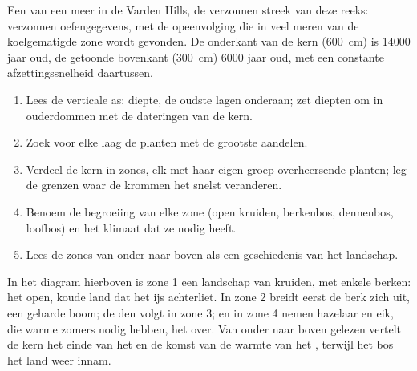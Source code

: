 \begin{omfigure}

{\small Een  van een meer in de Varden Hills, de verzonnen streek
van deze reeks: verzonnen oefengegevens, met de opeenvolging die in veel
meren van de koelgematigde zone wordt gevonden. De onderkant van de kern (\qty{600}{cm}) is
\num{14000} jaar oud, de getoonde bovenkant (\qty{300}{cm}) \num{6000} jaar oud,
met een constante afzettingssnelheid daartussen.}
\end{omfigure}

\begin{method}
\begin{enumerate}
  \item Lees de verticale as: diepte, de oudste lagen onderaan;
        zet diepten om in ouderdommen met de dateringen van de kern.
  \item Zoek voor elke laag de planten met de grootste aandelen.
  \item Verdeel de kern in zones, elk met haar eigen groep overheersende
        planten; leg de grenzen waar de krommen het snelst veranderen.
  \item Benoem de begroeiing van elke zone (open kruiden, berkenbos, dennenbos,
        loofbos) en het klimaat dat ze nodig heeft.
  \item Lees de zones van onder naar boven als een geschiedenis van het landschap.
\end{enumerate}
\end{method}

In het diagram hierboven is zone 1 een landschap van kruiden, met enkele berken: het
open, koude land dat het ijs achterliet. In zone 2 breidt eerst de berk zich uit, een geharde
boom; de den volgt in zone 3; en in zone 4 nemen hazelaar en eik, die warme
zomers nodig hebben, het over. Van onder naar boven gelezen vertelt de kern het einde van het
 en de komst van de warmte van het , terwijl het
bos het land weer innam.

